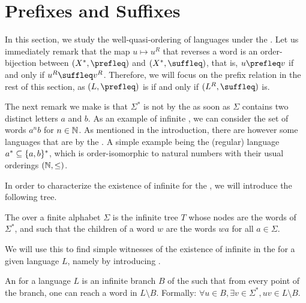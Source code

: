 \section{Prefixes and Suffixes}
\label{prefixes:sec}

In this section, we study the well-quasi-ordering of languages under the
. Let us immediately remark that the map $u \mapsto u^R$
that reverses a word is an order-bijection between $(X^*, \prefleq)$ and $(X^*,
\suffleq)$, that is, $u \prefleq v$ if and only if $u^R \suffleq v^R$.
Therefore, we will focus on the prefix relation in the rest of this section, as
$(L, \prefleq)$ is  if and only if $(L^R, \suffleq)$ is.

The next remark we make is that $\Sigma^*$ is not  by
the  as soon as $\Sigma$ contains two distinct letters $a$
and $b$. As an example of infinite , we can consider the set of
words $a^n b$ for $n \in \mathbb{N}$. As mentioned in the introduction, there are
however some languages  that are  by the . A simple example being the (regular) language $a^* \subseteq
\{ a,b \}^*$, which is order-isomorphic to natural numbers with their usual
orderings $(\mathbb{N}, \leq)$.

In order to characterize the existence of infinite  for the
, we will introduce the following tree.

\begin{definition}
    The  over a finite alphabet $\Sigma$
    is the infinite tree $T$ whose nodes are the words of $\Sigma^*$, and
    such that the children of a word $w$ are the words $wa$ for all $a \in
    \Sigma$. 
\end{definition}

We will use this  to find simple witnesses
of the existence of infinite  in the 
for a given language $L$, namely by introducing .

\begin{definition}
    An  for a language $L$ is an infinite 
    branch $B$ of the  such that from every point of the branch, 
    one can reach a word in $L \setminus B$. Formally:
    $\forall u \in B, \exists v \in \Sigma^*, uv \in L \setminus B$.
\end{definition}

